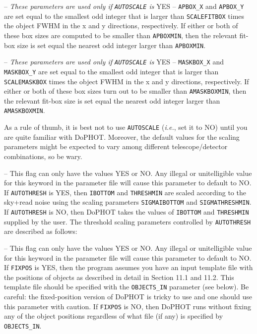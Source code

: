 -- 
{\it These parameters are used
only if {\tt AUTOSCALE} is} YES -- 
{\tt APBOX\_X} and 
{\tt APBOX\_Y} are set equal to the smallest odd integer
that is larger than 
{\tt SCALEFITBOX} times the object FWHM in the x and y
directions, respectively.  If either or
both of these 
box sizes are computed to be smaller than {\tt APBOXMIN},
then the relevant fit-box size is set equal the nearest
odd integer larger than {\tt APBOXMIN}.

 -- 
{\it These parameters are used
only if {\tt AUTOSCALE} is} YES -- 
{\tt MASKBOX\_X} and 
{\tt MASKBOX\_Y} are set equal to the smallest odd integer
that is larger than 
{\tt SCALEMASKBOX} times the object FWHM in the x and y
directions, respectively.  If either or both of these 
box sizes turn out to be smaller than {\tt AMASKBOXMIN},
then the relevant fit-box size is set equal the nearest
odd integer larger than {\tt AMASKBOXMIN}.

\noindent As a rule of thumb, it is best not to use
{\tt AUTOSCALE} ({\it i.e.}, set it to NO) until you are quite 
familiar with DoPHOT.  Moreover, the default values for the
scaling parameters might be expected to vary among different
telescope/detector combinations, so be wary.

 -- This flag can only have the 
values YES or NO.  Any illegal or unitelligible
value for this keyword in the parameter file
will cause this parameter to default to NO.
If {\tt AUTOTHRESH} is YES, then {\tt IBOTTOM} and {\tt THRESHMIN}
are scaled according to the sky+read noise
using the scaling parameters {\tt SIGMAIBOTTOM} and 
{\tt SIGMATHRESHMIN}.  If {\tt AUTOTHRESH} is NO, then
DoPHOT takes the values of {\tt IBOTTOM} and 
{\tt THRESHMIN} supplied by the user.  The threshold scaling
parameters controlled by {\tt AUTOTHRESH} are described
as follows:

 -- This flag can only have the values
YES or NO.  Any illegal or unitelligible
value for this keyword in the parameter file
will cause this parameter to default to NO.
If {\tt FIXPOS} is YES, then the program assumes you have
an input template file with the positions of objects as
described in detail in Section 11.1 and 11.2.  This template
file should be specified with the {\tt OBJECTS\_IN} parameter
(see below).  Be careful:  the fixed-position version of
DoPHOT is tricky to use and one should use this parameter
with caution.  If {\tt FIXPOS} is NO, then DoPHOT runs without
fixing any of the object positions regardless of what file
(if any) is specified by {\tt OBJECTS\_IN}.

